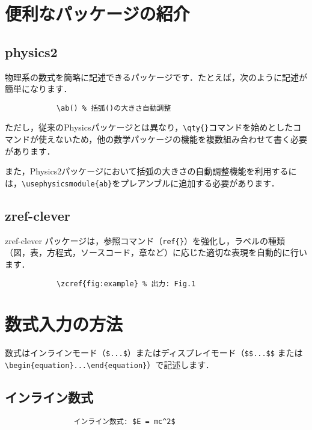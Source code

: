     \section{便利なパッケージの紹介}
        \subsection{physics2}
        物理系の数式を簡略に記述できるパッケージです．たとえば，次のように記述が簡単になります．

            \begin{verbatim}
            \ab() % 括弧()の大きさ自動調整
            \end{verbatim}

        ただし，従来のPhysicsパッケージとは異なり，\verb|\qty{}|コマンドを始めとしたコマンドが使えないため，他の数学パッケージの機能を複数組み合わせて書く必要があります．

        また，Physics2パッケージにおいて括弧の大きさの自動調整機能を利用するには，\verb|\usephysicsmodule{ab}|をプレアンブルに追加する必要があります．

        \subsection{zref-clever}
        zref-clever パッケージは，参照コマンド（\verb|ref{}|）を強化し，ラベルの種類（図，表，方程式，ソースコード，章など）に応じた適切な表現を自動的に行います．

            \begin{verbatim}
            \zcref{fig:example} % 出力: Fig.1
            \end{verbatim}

    \section{数式入力の方法}
        数式はインラインモード（\verb|$...$|）またはディスプレイモード（\verb|$$...$$| または \verb|\begin{equation}...\end{equation}|）で記述します．

        \subsection{インライン数式}
            \begin{verbatim}
                インライン数式: $E = mc^2$
            \end{verbatim}

